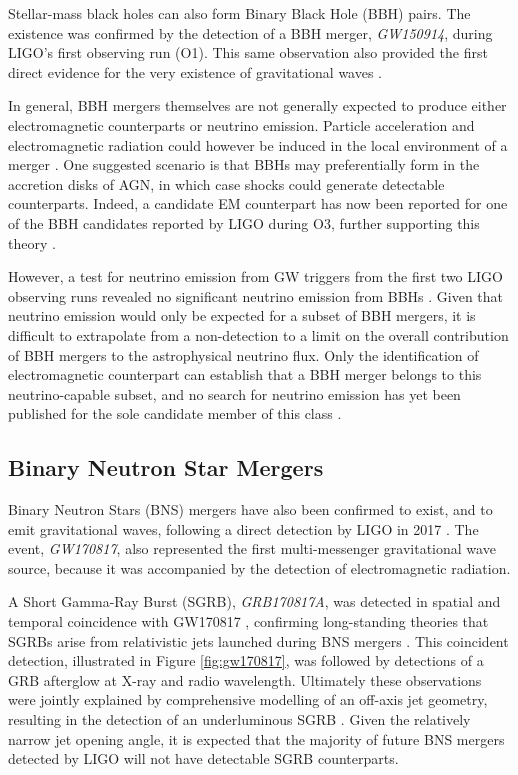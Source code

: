 Stellar-mass black holes can also form Binary Black Hole (BBH) pairs. The existence was confirmed by the detection of a BBH merger, \emph{GW150914}, during LIGO's first observing run (O1). This same observation also provided the first direct evidence for the very existence of gravitational waves .

In general, BBH mergers themselves are not generally expected to produce either electromagnetic counterparts or neutrino emission. Particle acceleration and electromagnetic radiation could however be induced in the local environment of a merger . One suggested scenario is that BBHs may preferentially form in the accretion disks of AGN, in which case shocks could generate detectable counterparts. Indeed, a candidate EM counterpart has now been reported for one of the BBH candidates reported by LIGO during O3, further supporting this theory .

However, a test for neutrino emission from GW triggers from the first two LIGO observing runs revealed no significant neutrino emission from BBHs . Given that neutrino emission would only be expected for a subset of BBH mergers, it is difficult to extrapolate from a non-detection to a limit on the overall contribution of BBH mergers to the astrophysical neutrino flux. Only the identification of electromagnetic counterpart can establish that a BBH merger belongs to this neutrino-capable subset, and no search for neutrino emission has yet been published for the sole candidate member of this class \cite{graham_gw_20}.

\subsection*{Binary Neutron Star Mergers}

Binary Neutron Stars (BNS) mergers have also been confirmed to exist, and to emit gravitational waves, following a direct detection by LIGO in 2017 . The event, \emph{GW170817}, also represented the first multi-messenger gravitational wave source, because it was accompanied by the detection of electromagnetic radiation.

A Short Gamma-Ray Burst (SGRB), \emph{GRB170817A}, was detected in spatial and temporal coincidence with GW170817 , confirming long-standing theories that SGRBs arise from relativistic jets launched during BNS mergers . This coincident detection, illustrated in Figure \ref{fig:gw170817}, was followed by detections of a GRB afterglow at X-ray and radio wavelength. Ultimately these observations were jointly explained by comprehensive modelling of an off-axis jet geometry, resulting in the detection of an underluminous SGRB . Given the relatively narrow jet opening angle, it is expected that the majority of future BNS mergers detected by LIGO will not have detectable SGRB counterparts.

